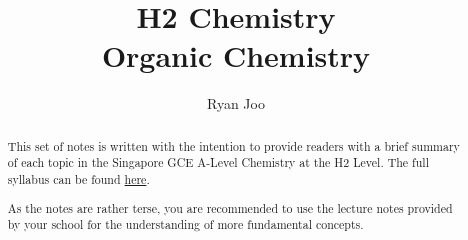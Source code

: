 \documentclass[12pt,a4 paper]{article}
\begin{document}
\title{\textbf{H2 Chemistry\\ Organic Chemistry}}
\author{Ryan Joo}

\maketitle

\begin{abstract}
This set of notes is written with the intention to provide readers with a brief summary of each topic in the Singapore GCE A-Level Chemistry at the H2 Level. The full syllabus can be found \href{https://www.seab.gov.sg/docs/default-source/national-examinations/syllabus/alevel/2024syllabus/9729_y24_sy.pdf}{here}.

As the notes are rather terse, you are recommended to use the lecture notes provided by your school for the understanding of more fundamental concepts.
\end{abstract}
\pagebreak

\tableofcontents
\pagebreak
\end{document}
